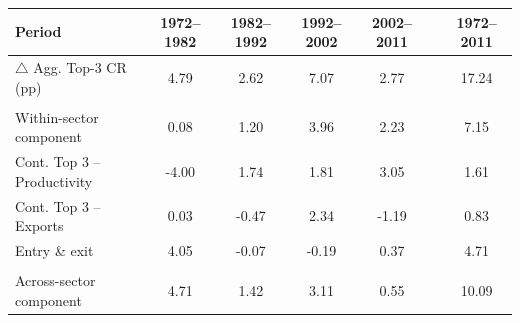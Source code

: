 \begin{tabular}{lcccccc}
\toprule
Period & 1972--1982 & 1982--1992 & 1992--2002 & 2002--2011 & & 1972--2011 \\
\midrule
$\triangle$ Agg. Top-3 CR (pp) & 4.79 & 2.62 & 7.07 & 2.77 && 17.24 \\ 
& & & & & & \\
Within-sector component & 0.08 & 1.20 & 3.96 & 2.23 && 7.15 \\ 
\hspace*{3mm} Cont. Top 3 -- Productivity & -4.00 & 1.74 & 1.81 & 3.05 && 1.61 \\ 
\hspace*{3mm} Cont. Top 3 -- Exports & 0.03 & -0.47 & 2.34 & -1.19 && 0.83 \\ 
\hspace*{3mm} Entry \& exit & 4.05 & -0.07 & -0.19 & 0.37 && 4.71 \\ 
& & & & & & \\
Across-sector component & 4.71 & 1.42 & 3.11 & 0.55 && 10.09 \\ 
\bottomrule
\end{tabular}
